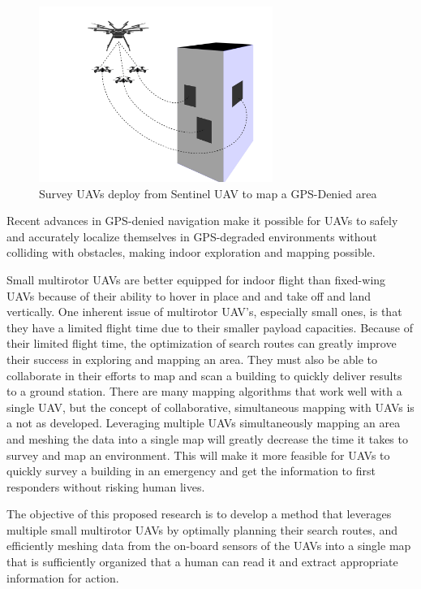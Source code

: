 \documentclass[12pt, letterpaper]{article}
\begin{document}
\begin{figure}[h] %
	\centering
	\includegraphics[trim = 0mm 0mm 0mm 0mm,clip,width=3in]{survey_drone_illustration.png}
	\caption{Survey UAVs deploy from Sentinel UAV to map a GPS-Denied area}
	\label{fig:sentinel_survey}
\end{figure}

Recent advances in GPS-denied navigation \cite{Wheeler2017} make it possible for UAVs to safely and accurately localize themselves in GPS-degraded environments without colliding with obstacles, making indoor exploration and mapping possible. 

Small multirotor UAVs are better equipped for indoor flight than fixed-wing UAVs because of their ability to hover in place and and take off and land vertically. One inherent issue of multirotor UAV's, especially small ones, is that they have a limited flight time due to their smaller payload capacities. Because of their limited flight time, the optimization of search routes can greatly improve their success in exploring and mapping an area. They must also be able to collaborate in their efforts to map and scan a building to quickly deliver results to a ground station. There are many mapping algorithms that work well with a single UAV, but the concept of collaborative, simultaneous mapping with UAVs is a not as developed. Leveraging multiple UAVs simultaneously mapping an area and meshing the data into a single map will greatly decrease the time it takes to survey and map an environment. This will make it more feasible for UAVs to quickly survey a building in an emergency and get the information to first responders without risking human lives.

The objective of this proposed research is to develop a method that leverages multiple small multirotor UAVs by optimally planning their search routes, and efficiently meshing data from the on-board sensors of the UAVs into a single map that is sufficiently organized that a human can read it and extract appropriate information for action. 
\end{document}
